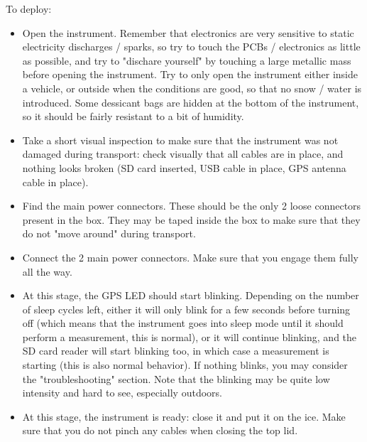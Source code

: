 \documentclass[pdftex,a4paper,12pt,twocolumn,fleqn,captions=tableheading]{scrartcl}
\begin{document}
To deploy:

\begin{itemize}
  \item Open the instrument. Remember that electronics are very sensitive to static electricity discharges / sparks, so try to touch the PCBs / electronics as little as possible, and try to "dischare yourself" by touching a large metallic mass before opening the instrument. Try to only open the instrument either inside a vehicle, or outside when the conditions are good, so that no snow / water is introduced. Some dessicant bags are hidden at the bottom of the instrument, so it should be fairly resistant to a bit of humidity.
  \item Take a short visual inspection to make sure that the instrument was not damaged during transport: check visually that all cables are in place, and nothing looks broken (SD card inserted, USB cable in place, GPS antenna cable in place).
  \item Find the main power connectors. These should be the only 2 loose connectors present in the box. They may be taped inside the box to make sure that they do not "move around" during transport.
  \item Connect the 2 main power connectors. Make sure that you engage them fully all the way.
  \item At this stage, the GPS LED should start blinking. Depending on the number of sleep cycles left, either it will only blink for a few seconds before turning off (which means that the instrument goes into sleep mode until it should perform a measurement, this is normal), or it will continue blinking, and the SD card reader will start blinking too, in which case a measurement is starting (this is also normal behavior). If nothing blinks, you may consider the "troubleshooting" section. Note that the blinking may be quite low intensity and hard to see, especially outdoors.
  \item At this stage, the instrument is ready: close it and put it on the ice. Make sure that you do not pinch any cables when closing the top lid.
\end{itemize}
\end{document}
